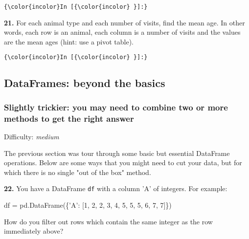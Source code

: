 \documentclass[11pt]{article}
\newenvironment{Shaded}{}{}
\newcommand{\DecValTok}[1]{\textcolor[rgb]{0.25,0.63,0.44}{{#1}}}
\newcommand{\StringTok}[1]{\textcolor[rgb]{0.25,0.44,0.63}{{#1}}}
\newcommand{\NormalTok}[1]{{#1}}
\newcommand{\OperatorTok}[1]{\textcolor[rgb]{0.40,0.40,0.40}{{#1}}}
\begin{document}
    \begin{Verbatim}[commandchars=\\\{\}]
{\color{incolor}In [{\color{incolor} }]:} 
\end{Verbatim}


    \textbf{21.} For each animal type and each number of visits, find the
mean age. In other words, each row is an animal, each column is a number
of visits and the values are the mean ages (hint: use a pivot table).

    \begin{Verbatim}[commandchars=\\\{\}]
{\color{incolor}In [{\color{incolor} }]:} 
\end{Verbatim}


    \subsection{DataFrames: beyond the
basics}\label{dataframes-beyond-the-basics}

\subsubsection{Slightly trickier: you may need to combine two or more
methods to get the right
answer}\label{slightly-trickier-you-may-need-to-combine-two-or-more-methods-to-get-the-right-answer}

Difficulty: \emph{medium}

The previous section was tour through some basic but essential DataFrame
operations. Below are some ways that you might need to cut your data,
but for which there is no single "out of the box" method.

    \textbf{22.} You have a DataFrame \texttt{df} with a column 'A' of
integers. For example:

\begin{Shaded}
\begin{Highlighting}[]
\NormalTok{df }\OperatorTok{=}\NormalTok{ pd.DataFrame(\{}\StringTok{'A'}\NormalTok{: [}\DecValTok{1}\NormalTok{, }\DecValTok{2}\NormalTok{, }\DecValTok{2}\NormalTok{, }\DecValTok{3}\NormalTok{, }\DecValTok{4}\NormalTok{, }\DecValTok{5}\NormalTok{, }\DecValTok{5}\NormalTok{, }\DecValTok{5}\NormalTok{, }\DecValTok{6}\NormalTok{, }\DecValTok{7}\NormalTok{, }\DecValTok{7}\NormalTok{]\})}
\end{Highlighting}
\end{Shaded}

How do you filter out rows which contain the same integer as the row
immediately above?
\end{document}
